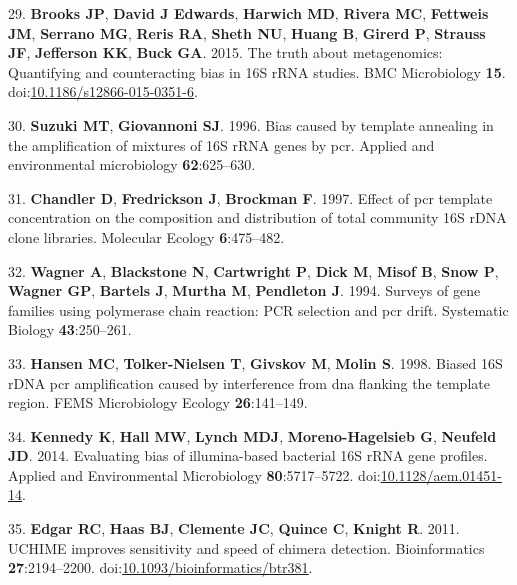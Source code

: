 \documentclass[11pt,]{article}
\begin{document}
\hypertarget{ref-Brooks2015}{}
29. \textbf{Brooks JP}, \textbf{David J Edwards}, \textbf{Harwich MD},
\textbf{Rivera MC}, \textbf{Fettweis JM}, \textbf{Serrano MG},
\textbf{Reris RA}, \textbf{Sheth NU}, \textbf{Huang B}, \textbf{Girerd
P}, \textbf{Strauss JF}, \textbf{Jefferson KK}, \textbf{Buck GA}. 2015.
The truth about metagenomics: Quantifying and counteracting bias in 16S
rRNA studies. BMC Microbiology \textbf{15}.
doi:\href{https://doi.org/10.1186/s12866-015-0351-6}{10.1186/s12866-015-0351-6}.

\hypertarget{ref-Suzuki1996}{}
30. \textbf{Suzuki MT}, \textbf{Giovannoni SJ}. 1996. Bias caused by
template annealing in the amplification of mixtures of 16S rRNA genes by
pcr. Applied and environmental microbiology \textbf{62}:625--630.

\hypertarget{ref-Chandler1997}{}
31. \textbf{Chandler D}, \textbf{Fredrickson J}, \textbf{Brockman F}.
1997. Effect of pcr template concentration on the composition and
distribution of total community 16S rDNA clone libraries. Molecular
Ecology \textbf{6}:475--482.

\hypertarget{ref-Wagner1994}{}
32. \textbf{Wagner A}, \textbf{Blackstone N}, \textbf{Cartwright P},
\textbf{Dick M}, \textbf{Misof B}, \textbf{Snow P}, \textbf{Wagner GP},
\textbf{Bartels J}, \textbf{Murtha M}, \textbf{Pendleton J}. 1994.
Surveys of gene families using polymerase chain reaction: PCR selection
and pcr drift. Systematic Biology \textbf{43}:250--261.

\hypertarget{ref-Hansen1998}{}
33. \textbf{Hansen MC}, \textbf{Tolker-Nielsen T}, \textbf{Givskov M},
\textbf{Molin S}. 1998. Biased 16S rDNA pcr amplification caused by
interference from dna flanking the template region. FEMS Microbiology
Ecology \textbf{26}:141--149.

\hypertarget{ref-Kennedy2014}{}
34. \textbf{Kennedy K}, \textbf{Hall MW}, \textbf{Lynch MDJ},
\textbf{Moreno-Hagelsieb G}, \textbf{Neufeld JD}. 2014. Evaluating bias
of illumina-based bacterial 16S rRNA gene profiles. Applied and
Environmental Microbiology \textbf{80}:5717--5722.
doi:\href{https://doi.org/10.1128/aem.01451-14}{10.1128/aem.01451-14}.

\hypertarget{ref-Edgar2011}{}
35. \textbf{Edgar RC}, \textbf{Haas BJ}, \textbf{Clemente JC},
\textbf{Quince C}, \textbf{Knight R}. 2011. UCHIME improves sensitivity
and speed of chimera detection. Bioinformatics \textbf{27}:2194--2200.
doi:\href{https://doi.org/10.1093/bioinformatics/btr381}{10.1093/bioinformatics/btr381}.
\end{document}
